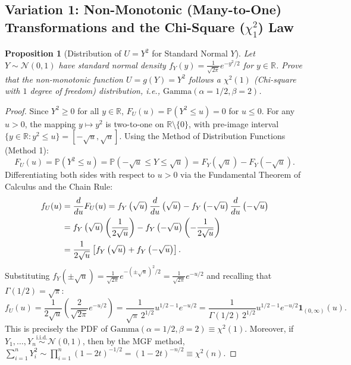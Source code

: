 \documentclass[11pt, letterpaper]{article}
\newtheorem{proposition}[theorem]{Proposition}
\theoremstyle{definition}
\theoremstyle{remark}
\newcommand{\R}{\mathbb{R}}
\newcommand{\Prob}{\mathbb{P}}
\begin{document}
\subsection{Variation 1: Non-Monotonic (Many-to-One) Transformations and the Chi-Square ($\chi^2_1$) Law}

\begin{proposition}[Distribution of $U = Y^2$ for Standard Normal $Y$]
Let $Y \sim \mathcal{N}(0, 1)$ have standard normal density $f_Y(y) = \frac{1}{\sqrt{2\pi}} e^{-y^2/2}$ for $y \in \R$. Prove that the non-monotonic function $U = g(Y) = Y^2$ follows a $\chi^2(1)$ (Chi-square with $1$ degree of freedom) distribution, i.e., $\text{Gamma}(\alpha = 1/2, \beta = 2)$.
\end{proposition}

\begin{proof}
Since $Y^2 \ge 0$ for all $y \in \R$, $F_U(u) = \Prob(Y^2 \le u) = 0$ for $u \le 0$. For any $u > 0$, the mapping $y \mapsto y^2$ is two-to-one on $\R \setminus \{0\}$, with pre-image interval $\{y \in \R : y^2 \le u\} = [-\sqrt{u}, \sqrt{u}]$. Using the Method of Distribution Functions (Method 1):
\[
    F_U(u) = \Prob(Y^2 \le u) = \Prob\left(-\sqrt{u} \le Y \le \sqrt{u}\right) = F_Y\left(\sqrt{u}\right) - F_Y\left(-\sqrt{u}\right).
\]
Differentiating both sides with respect to $u > 0$ via the Fundamental Theorem of Calculus and the Chain Rule:
\begin{align*}
    f_U(u) &= \frac{d}{du} F_U(u) = f_Y\left(\sqrt{u}\right) \frac{d}{du}\left(\sqrt{u}\right) - f_Y\left(-\sqrt{u}\right) \frac{d}{du}\left(-\sqrt{u}\right) \\ \relax
    &= f_Y\left(\sqrt{u}\right) \left(\frac{1}{2\sqrt{u}}\right) - f_Y\left(-\sqrt{u}\right) \left(-\frac{1}{2\sqrt{u}}\right) \\ \relax
    &= \frac{1}{2\sqrt{u}} \left[ f_Y\left(\sqrt{u}\right) + f_Y\left(-\sqrt{u}\right) \right].
\end{align*}
Substituting $f_Y(\pm\sqrt{u}) = \frac{1}{\sqrt{2\pi}} e^{-(\pm\sqrt{u})^2/2} = \frac{1}{\sqrt{2\pi}} e^{-u/2}$ and recalling that $\Gamma(1/2) = \sqrt{\pi}$:
\[
    f_U(u) = \frac{1}{2\sqrt{u}} \left( \frac{2}{\sqrt{2\pi}} e^{-u/2} \right) = \frac{1}{\sqrt{\pi} \, 2^{1/2}} u^{1/2 - 1} e^{-u/2} = \frac{1}{\Gamma(1/2) \, 2^{1/2}} u^{1/2 - 1} e^{-u/2} \mathbf{1}_{(0, \infty)}(u).
\]
This is precisely the PDF of $\text{Gamma}(\alpha = 1/2, \beta = 2) \equiv \chi^2(1)$. Moreover, if $Y_1, \dots, Y_n \stackrel{\text{i.i.d.}}{\sim} \mathcal{N}(0, 1)$, then by the MGF method, $\sum_{i=1}^n Y_i^2 \sim \prod_{i=1}^n (1 - 2t)^{-1/2} = (1 - 2t)^{-n/2} \equiv \chi^2(n)$.
\end{proof}
\end{document}

